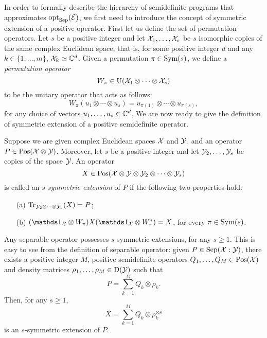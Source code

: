 In order to formally describe the hierarchy of semidefinite programs that 
approximates $\operatorname{opt}_{\mathrm{Sep}}(\mathcal{E})$, we first need to introduce the concept of 
symmetric extension of a positive operator. 
First let us define the set of permutation operators.
Let $s$ be a positive integer and let $\mathcal{X}_{1}, \ldots, \mathcal{X}_{s}$ be $s$ isomorphic 
copies of the same complex Euclidean space, that is, for some positive integer
$d$ and any $k \in \{1, \ldots, m \}$, $\mathcal{X}_{k} \simeq \mathbb{C}^{d}$. 
Given a permutation $\pi\in\mathrm{Sym}(s)$, we define
a \emph{permutation operator} 
\begin{equation}
  W_{\pi} \in \mathrm{U}(\mathcal{X}_{1}\otimes\cdots\otimes\mathcal{X}_{s})
\end{equation}
to be the unitary operator that acts as follows:
\begin{equation}
  W_{\pi}(u_{1}\otimes\cdots\otimes u_{s}) = u_{\pi(1)}\otimes\cdots
    \otimes u_{\pi(s)},
\end{equation}
for any choice of vectors $u_{1}, \ldots, u_{s}\in\mathbb{C}^{d}$.
We are now ready to give the definition of symmetric extension of a positive 
semidefinite operator. 

\begin{definition}
  Suppose we are given complex Euclidean spaces $\mathcal{X}$ and $\mathcal{Y}$, and an operator
  $P\in\mathrm{Pos}(\mathcal{X}\otimes\mathcal{Y})$. Moreover, let $s$ be a positive integer and let 
  $\mathcal{Y}_{2},\ldots,\mathcal{Y}_{s}$ be copies of the space $\mathcal{Y}$. An operator 
  \begin{equation}
    X \in \mathrm{Pos}(\mathcal{X}\otimes\mathcal{Y}\otimes\mathcal{Y}_{2}\otimes\cdots\otimes\mathcal{Y}_{s})
  \end{equation}
  is called an \emph{$s$-symmetric extension} of $P$ if the following two 
  properties hold:
  \begin{itemize}
    \item[(a)] $\operatorname{Tr}_{\mathcal{Y}_{2}\otimes\cdots\otimes\mathcal{Y}_{s}}(X) = P$;
    \item[(b)] $(\I_{\X}\otimes W_{\pi})X(\I_{\X}\otimes W_{\pi}^{\ast}) = X$,
      for every $\pi\in\mathrm{Sym}(s)$.
  \end{itemize}
\end{definition}

Any separable operator possesses $s$-symmetric extensions, for any $s \geq 1$. 
This is easy to see from the definition of separable operator: given 
$P\in\mathrm{Sep}(\mathcal{X}:\mathcal{Y})$, there exists a positive integer $M$, positive semidefinite 
operators $Q_1,\ldots,Q_M \in \mathrm{Pos}(\mathcal{X})$ and density matrices $\rho_1,\ldots, \rho_M\in\mathrm{D}(\mathcal{Y})$ 
such that
\begin{equation}
  P = \sum_{k = 1}^M Q_{k} \otimes \rho_{k}.
\end{equation} 
Then, for any $s \geq 1$,
\begin{equation}
\label{eq:X-extension}
  X = \sum_{k = 1}^M Q_k \otimes \rho_{k}^{\otimes s}
\end{equation}
is an $s$-symmetric extension of $P$.

